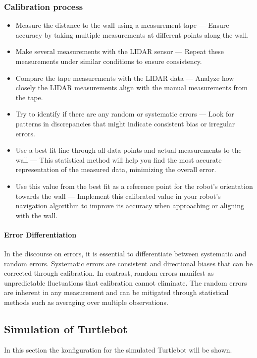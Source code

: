 \documentclass[12pt,a4paper]{article}
\begin{document}
	\subsubsection{Calibration process}
	\begin{itemize}
		\item Measure the distance to the wall using a measurement tape — Ensure accuracy by taking multiple measurements at different points along the wall.
		\item Make several measurements with the LIDAR sensor — Repeat these measurements under similar conditions to ensure consistency.
		\item Compare the tape measurements with the LIDAR data — Analyze how closely the LIDAR measurements align with the manual measurements from the tape.
		\item Try to identify if there are any random or systematic errors — Look for patterns in discrepancies that might indicate consistent bias or irregular errors.
		\item Use a best-fit line through all data points and actual measurements to the wall — This statistical method will help you find the most accurate representation of the measured data, minimizing the overall error.
		\item Use this value from the best fit as a reference point for the robot's orientation towards the wall — Implement this calibrated value in your robot’s navigation algorithm to improve its accuracy when approaching or aligning with the wall. 
	\end{itemize}
	
	\paragraph{Error Differentiation}
	In the discourse on errors, it is essential to differentiate between systematic and random errors. Systematic errors are consistent and directional biases that can be corrected through calibration. In contrast, random errors manifest as unpredictable fluctuations that calibration cannot eliminate. The random errors are inherent in any measurement and can be mitigated through statistical methods such as averaging over multiple observations.
	
	\subsection{Simulation of Turtlebot}
	In this section the konfiguration for the simulated Turtlebot will be shown.
\end{document}
